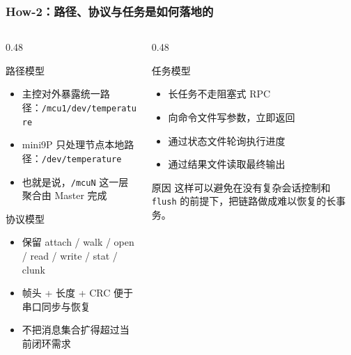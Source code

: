 \documentclass[aspectratio=169]{ctexbeamer}
\begin{document}
\begin{frame}
  \frametitle{How-2：路径、协议与任务是如何落地的}
  \begin{columns}[T]
    \begin{column}{0.48\textwidth}
      \begin{block}{路径模型}
        \small
        \begin{itemize}
          \item 主控对外暴露统一路径：\texttt{/mcu1/dev/temperature}
          \item mini9P 只处理节点本地路径：\texttt{/dev/temperature}
          \item 也就是说，\texttt{/mcuN} 这一层聚合由 Master 完成
        \end{itemize}
      \end{block}
      \begin{block}{协议模型}
        \small
        \begin{itemize}
          \item 保留 attach / walk / open / read / write / stat / clunk
          \item 帧头 + 长度 + CRC 便于串口同步与恢复
          \item 不把消息集合扩得超过当前闭环需求
        \end{itemize}
      \end{block}
    \end{column}
    \begin{column}{0.48\textwidth}
      \begin{block}{任务模型}
        \small
        \begin{itemize}
          \item 长任务不走阻塞式 RPC
          \item 向命令文件写参数，立即返回
          \item 通过状态文件轮询执行进度
          \item 通过结果文件读取最终输出
        \end{itemize}
      \end{block}
      \begin{alertblock}{原因}
        \small
        这样可以避免在没有复杂会话控制和 \texttt{flush} 的前提下，把链路做成难以恢复的长事务。
      \end{alertblock}
    \end{column}
  \end{columns}
\end{frame}
\end{document}
